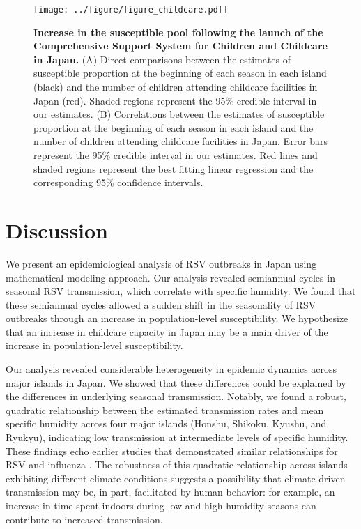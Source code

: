 \documentclass[12pt]{article}
\begin{document}
\begin{figure}[!th]
\texttt{[image: ../figure/figure\_childcare.pdf]}
\caption{
\textbf{Increase in the susceptible pool following the launch of the Comprehensive Support System for Children and Childcare in Japan.}
(A) Direct comparisons between the estimates of susceptible proportion at the beginning of each season in each island (black) and the number of children attending childcare facilities in Japan (red).
Shaded regions represent the 95\% credible interval in our estimates.
(B) Correlations between the estimates of susceptible proportion at the beginning of each season in each island and the number of children attending childcare facilities in Japan.
Error bars represent  the 95\% credible interval in our estimates.
Red lines and shaded regions represent the best fitting linear regression and the corresponding 95\% confidence intervals.
}
\label{fig:fig4}
\end{figure}

\section*{Discussion}

We present an epidemiological analysis of RSV outbreaks in Japan using mathematical modeling approach.
Our analysis revealed semiannual cycles in seasonal RSV transmission, which correlate with specific humidity.
We found that these semiannual cycles allowed a sudden shift in the seasonality of RSV outbreaks through an increase in population-level susceptibility.
We  hypothesize that an increase in childcare capacity in Japan may be a main driver of the increase in population-level susceptibility.

Our analysis revealed considerable heterogeneity in epidemic dynamics across major islands in Japan.
We showed that these differences could be explained by the differences in underlying seasonal transmission.
Notably, we found a robust, quadratic relationship between the estimated transmission rates and mean specific humidity across four major islands (Honshu, Shikoku, Kyushu, and Ryukyu), indicating low transmission at intermediate levels of specific humidity.
These findings echo earlier studies that demonstrated similar relationships for RSV \citep{baker2019epidemic} and influenza \citep{tamerius2013environmental}.
The robustness of this quadratic relationship across islands exhibiting different climate conditions suggests a possibility that climate-driven transmission may be, in part, facilitated by human behavior: for example, an increase in time spent indoors during low and high humidity seasons can contribute to increased transmission.
\end{document}
